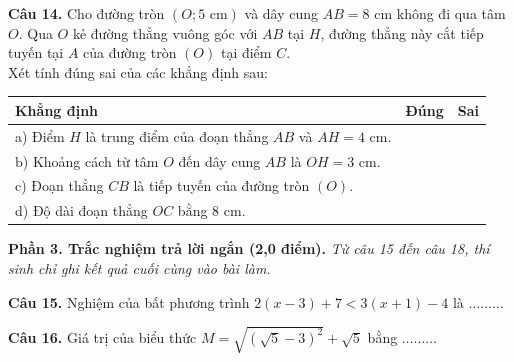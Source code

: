 \documentclass[11pt,a4paper]{article}
\begin{document}
\vspace{2mm}
\textbf{Câu 14.} Cho đường tròn $(O; 5\text{ cm})$ và dây cung $AB = 8\text{ cm}$ không đi qua tâm $O$. Qua $O$ kẻ đường thẳng vuông góc với $AB$ tại $H$, đường thẳng này cắt tiếp tuyến tại $A$ của đường tròn $(O)$ tại điểm $C$.\\
Xét tính đúng sai của các khẳng định sau:
\begin{center}
\begin{tabularx}{\linewidth}{|X|c|c|}
\hline
\textbf{Khẳng định} & \textbf{Đúng} & \textbf{Sai} \\
\hline
a) Điểm $H$ là trung điểm của đoạn thẳng $AB$ và $AH = 4\text{ cm}$. & & \\
\hline
b) Khoảng cách từ tâm $O$ đến dây cung $AB$ là $OH = 3\text{ cm}$. & & \\
\hline
c) Đoạn thẳng $CB$ là tiếp tuyến của đường tròn $(O)$. & & \\
\hline
d) Độ dài đoạn thẳng $OC$ bằng $8\text{ cm}$. & & \\
\hline
\end{tabularx}
\end{center}

\vspace{3mm}
\noindent
\textbf{Phần 3. Trắc nghiệm trả lời ngắn (2,0 điểm).} \textit{Từ câu 15 đến câu 18, thí sinh chỉ ghi kết quả cuối cùng vào bài làm.}

\vspace{1.5mm}
\textbf{Câu 15.} Nghiệm của bất phương trình $2(x - 3) + 7 < 3(x + 1) - 4$ là $\dots\dots\dots$

\vspace{1.5mm}
\textbf{Câu 16.} Giá trị của biểu thức $M = \sqrt{(\sqrt{5} - 3)^2} + \sqrt{5}$ bằng $\dots\dots\dots$
\end{document}
